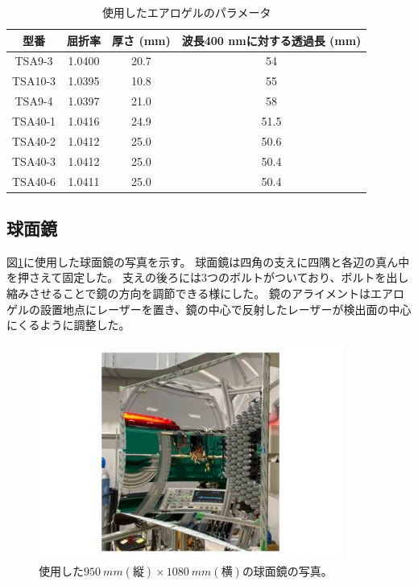 \begin{table}[htbp]
  \caption{使用したエアロゲルのパラメータ}
  \label{table:Aerogel}
  \centering
  \begin{tabular}{cccc}
    \hline
    型番      & 屈折率    & 厚さ (mm) & 波長400 nmに対する透過長 (mm) \\
    \hline\hline
    TSA9-3  & 1.0400 & 20.7    & 54                   \\
    TSA10-3 & 1.0395 & 10.8    & 55                   \\
    TSA9-4  & 1.0397 & 21.0    & 58                   \\
    TSA40-1 & 1.0416 & 24.9    & 51.5                 \\
    TSA40-2 & 1.0412 & 25.0    & 50.6                 \\
    TSA40-3 & 1.0412 & 25.0    & 50.4                 \\
    TSA40-6 & 1.0411 & 25.0    & 50.4                 \\
    \hline
  \end{tabular}
\end{table}

\subsection{球面鏡}
図\ref{fig:Mirror}に使用した球面鏡の写真を示す。
球面鏡は四角の支えに四隅と各辺の真ん中を押さえて固定した。
支えの後ろには3つのボルトがついており、ボルトを出し縮みさせることで鏡の方向を調節できる様にした。
鏡のアライメントはエアロゲルの設置地点にレーザーを置き、鏡の中心で反射したレーザーが検出面の中心にくるように調整した。

\begin{figure}
  \centering
  \includegraphics[width=10cm]{images/chapter3/Mirror.pdf}
  \caption{使用した$\SI{950}{mm}(縦)\times\SI{1080}{mm}(横)$の球面鏡の写真。}
  \label{fig:Mirror}
\end{figure}